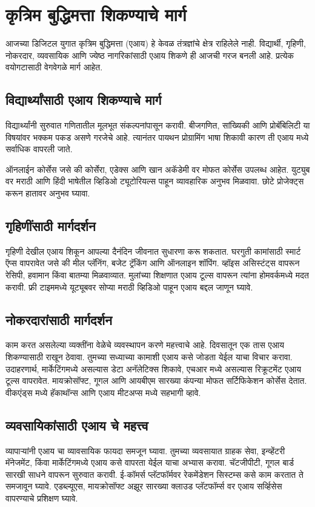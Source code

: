 \chapter{कृत्रिम बुद्धिमत्ता शिकण्याचे मार्ग}

आजच्या डिजिटल युगात कृत्रिम बुद्धिमत्ता (एआय) हे केवळ तंत्रज्ञांचे क्षेत्र राहिलेले नाही. विद्यार्थी, गृहिणी, नोकरदार, व्यवसायिक आणि ज्येष्ठ नागरिकांसाठी एआय शिकणे ही आजची गरज बनली आहे. प्रत्येक वयोगटासाठी वेगवेगळे मार्ग आहेत.

\section*{विद्यार्थ्यांसाठी एआय शिकण्याचे मार्ग}

विद्यार्थ्यांनी सुरुवात गणितातील मूलभूत संकल्पनांपासून करावी. बीजगणित, सांख्यिकी आणि प्रोबॅबिलिटी या विषयांवर भक्कम पकड असणे गरजेचे आहे. त्यानंतर पायथन प्रोग्रामिंग भाषा शिकावी कारण ती एआय मध्ये सर्वाधिक वापरली जाते.

ऑनलाईन कोर्सेस जसे की कोर्सेरा, एडेक्स  आणि खान अकॅडेमी वर मोफत कोर्सेस उपलब्ध आहेत. युट्युब  वर मराठी आणि हिंदी भाषेतील व्हिडिओ ट्यूटोरियल्स पाहून व्यावहारिक अनुभव मिळवावा. छोटे प्रोजेक्ट्स करून हातावर अनुभव घ्यावा.

\section*{गृहिणींसाठी  मार्गदर्शन}
गृहिणी देखील एआय शिकून आपल्या दैनंदिन जीवनात सुधारणा करू शकतात. घरगुती कामांसाठी स्मार्ट ऍप्स वापरावेत जसे की मील प्लॅनिंग, बजेट ट्रॅकिंग आणि ऑनलाइन शॉपिंग. व्हॉइस असिस्टंट्स वापरून रेसिपी, हवामान किंवा बातम्या मिळवाव्यात. मुलांच्या शिक्षणात एआय टूल्स वापरून त्यांना होमवर्कमध्ये मदत करावी. फ्री टाइममध्ये यूट्यूबवर सोप्या मराठी व्हिडिओ पाहून एआय बद्दल जाणून घ्यावे.

\section*{नोकरदारांसाठी मार्गदर्शन}
काम करत असलेल्या व्यक्तींना वेळेचे व्यवस्थापन करणे महत्त्वाचे आहे. दिवसातून एक तास एआय शिकण्यासाठी राखून ठेवावा. तुमच्या सध्याच्या कामाशी एआय कसे जोडता येईल याचा विचार करावा.
उदाहरणार्थ, मार्केटिंगमध्ये असल्यास डेटा अनॅलेटिक्स शिकावे, एचआर मध्ये असल्यास रिक्रूटमेंट एआय टूल्स वापरावेत. मायक्रोसॉफ्ट, गूगल आणि आयबीएम सारख्या कंपन्या मोफत सर्टिफिकेशन कोर्सेस देतात. वीकएंड्स मध्ये हॅकाथॉन्स आणि एआय मीटअप्स मध्ये सहभागी व्हावे.

\section*{व्यवसायिकांसाठी एआय चे महत्त्व}
व्यापार्‍यांनी एआय चा व्यावसायिक फायदा समजून घ्यावा. तुमच्या व्यवसायात ग्राहक सेवा, इन्व्हेंटरी मॅनेजमेंट, किंवा मार्केटिंगमध्ये एआय कसे वापरता येईल याचा अभ्यास करावा.
चॅटजीपीटी, गूगल बार्ड सारखी साधने वापरून सुरुवात करावी. ई-कॉमर्स प्लॅटफॉर्मवर रेकमेंडेशन सिस्टम्स कसे काम करतात ते समजावून घ्यावे. एडब्ल्यूएस, मायक्रोसॉफ्ट अझूर सारख्या क्लाउड प्लॅटफॉर्म्स वर एआय सर्व्हिसेस वापरण्याचे प्रशिक्षण घ्यावे.

